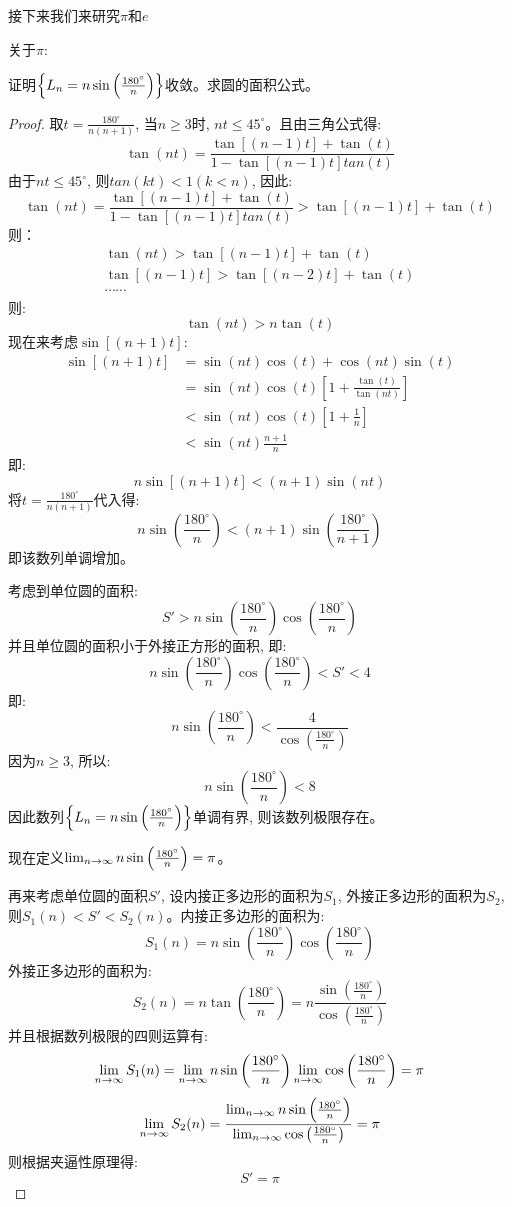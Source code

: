 \documentclass[lang=cn]{elegantbook}
\begin{document}
接下来我们来研究$\pi$和$e$

关于$\pi$:
\begin{proposition}
    证明$\left\{ L_n = n\sin \left ( \frac{180^\circ}{n} \right )\right\}$收敛。求圆的面积公式。
\end{proposition}
\begin{proof}
取$t = \frac{180^\circ}{n(n+1)}$, 当$n \ge 3$时, $nt \le 45^\circ$。且由三角公式得: 
\[ \tan (nt) = \frac{\tan[(n-1)t] + \tan(t)}{1 - \tan[(n-1)t]tan(t)} \]
由于$nt \le 45^\circ$, 则$tan(kt) < 1(k < n)$, 因此: 
\[ \tan (nt) = \frac{\tan[(n-1)t] + \tan(t)}{1 - \tan[(n-1)t]tan(t)} > \tan[(n-1)t] + \tan(t)\]
则：
\begin{gather*}
    \tan(nt) > \tan[(n-1)t] + \tan(t) \\ 
    \tan[(n-1)t] > \tan[(n-2)t] + \tan(t) \\
    \cdots \cdots
\end{gather*}
则: 
\[ \tan(nt) > n\tan(t)\]
现在来考虑$\sin[(n+1)t]$: 
\[
\begin{split}
    \sin[(n+1)t] &= \sin(nt)\cos(t) + \cos(nt)\sin(t) \\
                &= \sin(nt)\cos(t)\left[ 1 + \frac{\tan(t)}{\tan(nt)}\right] \\
                &< \sin(nt)\cos(t)\left[ 1 + \frac{1}{n} \right] \\
                & < \sin(nt)\frac{n+1}{n}
\end{split}
\]
即: 
\[ n\sin[(n+1)t] < (n+1)\sin(nt) \]
将$t = \frac{180^\circ}{n(n+1)}$代入得: 
\[ n\sin\left( \frac{180^\circ}{n}\right) < (n + 1)\sin\left( \frac{180^\circ}{n+1} \right)\]
即该数列单调增加。

考虑到单位圆的面积: 
\[ S' > n \sin\left( \frac{180^\circ}{n}\right) \cos\left( \frac{180^\circ}{n}\right) \]
并且单位圆的面积小于外接正方形的面积, 即: 
\[ n \sin\left( \frac{180^\circ}{n}\right) \cos\left( \frac{180^\circ}{n}\right) < S' < 4 \]
即: 
\[ n\sin\left( \frac{180^\circ}{n}\right) < \frac{4}{\cos\left( \frac{180^\circ}{n}\right)}\]
因为$n \ge 3$, 所以: 
\[ n\sin\left( \frac{180^\circ}{n}\right) < 8\]
因此数列$\left\{ L_n = n\sin \left ( \frac{180^\circ}{n} \right )\right\}$单调有界, 则该数列极限存在。

现在定义$\lim_{n \to \infty } n\sin \left ( \frac{180^\circ}{n} \right ) = \pi$。

再来考虑单位圆的面积$S'$, 设内接正多边形的面积为$S_1$, 外接正多边形的面积为$S_2$, 则$S_1(n) < S' < S_2(n)$。内接正多边形的面积为:
\[ S_1(n) = n \sin\left( \frac{180^\circ}{n}\right) \cos\left( \frac{180^\circ}{n}\right)\]
外接正多边形的面积为: 
\[ S_2(n) = n \tan\left( \frac{180^\circ}{n}\right)  = n \frac{\sin\left( \frac{180^\circ}{n}\right)}{\cos\left( \frac{180^\circ}{n}\right)} \]
并且根据数列极限的四则运算有:
\[ \lim_{n \to \infty } S_1(n) = \lim_{n \to \infty } n \sin\left( \frac{180^\circ}{n}\right) \lim_{n \to \infty } \cos\left( \frac{180^\circ}{n}\right) = \pi\]
\[ \lim_{n \to \infty } S_2(n) = \frac{\lim_{n \to \infty } n\sin\left( \frac{180^\circ}{n}\right)}{\lim_{n \to \infty } \cos\left( \frac{180^\circ}{n}\right)} = \pi\]
则根据夹逼性原理得:
\[ S' = \pi \]


\end{proof}
\end{document}
